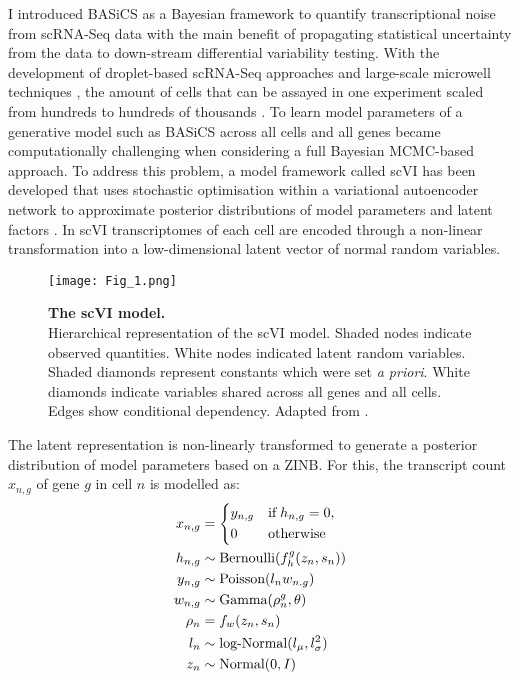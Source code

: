 I introduced BASiCS as a Bayesian framework to quantify transcriptional noise from scRNA-Seq data with the main benefit of propagating statistical uncertainty from the data to down-stream differential variability testing.
With the development of droplet-based scRNA-Seq approaches \citep{Macosko2015, Klein2015} and large-scale microwell techniques \citep{Han2018}, the amount of cells that can be assayed in one experiment scaled from hundreds to hundreds of thousands \citep{Svensson2018}. To learn model parameters of a generative model such as BASiCS across all cells and all genes became computationally challenging when considering a full Bayesian MCMC-based approach. To address this problem, a model framework called \gls{scVI} has been developed that uses stochastic optimisation within a variational autoencoder network to approximate posterior distributions of model parameters and latent factors \citep{Lopez2018}. In scVI transcriptomes of each cell are encoded through a non-linear transformation into a low-dimensional latent vector of normal random variables. \\

\begin{wrapfigure}{r}{0.5\textwidth}
\centering    
\texttt{[image: Fig\_1.png]}
\caption[The scVI model.]{\textbf{The scVI model.} \\
Hierarchical representation of the scVI model. Shaded nodes indicate observed quantities. White nodes indicated latent random variables. Shaded diamonds represent constants which were set \emph{a priori}. White diamonds indicate variables shared across all genes and all cells. Edges show conditional dependency. Adapted from \citep{Lopez2018}.}
\label{fig0:scVI}
\vspace{-60mm}
\end{wrapfigure}

The latent representation is non-linearly transformed to generate a posterior distribution of model parameters based on a ZINB. For this, the transcript count $x_{n,g}$ of gene $g$ in cell $n$ is modelled as:\\

\begin{align*}
x_{n,g} & = 
 \left\lbrace
  \begin{aligned}
    & y_{n,g} && \textnormal{if} \; h_{n,g} = 0,  \\ 
    & 0 && \textnormal{otherwise}    	    
  \end{aligned}
\right.\\
h_{n,g} & \sim \textnormal{Bernoulli}(f_h^g(z_n,s_n))\\
y_{n,g} & \sim \textnormal{Poisson}(l_nw_{n.g})\\
w_{n,g} & \sim \textnormal{Gamma}(\rho^g_n, \theta)\\
\rho_n & = f_w(z_n,s_n)\\
l_n & \sim \textnormal{log-Normal}(l_{\mu},l^2_{\sigma})\\
z_n & \sim \textnormal{Normal}(0,I)
\end{align*}

